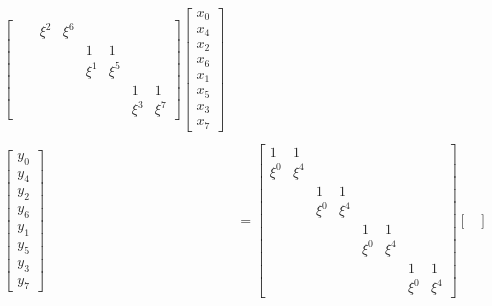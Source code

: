 \documentclass{jsarticle}
\begin{document}
\begin{align*}
\begin{bmatrix}
          &       & \xi^2 & \xi^6 &       &       &       &       \\
          &       &       &       & 1     & 1     &       &       \\
          &       &       &       & \xi^1 & \xi^5 &       &       \\
          &       &       &       &       &       & 1     & 1     \\
          &       &       &       &       &       & \xi^3 & \xi^7
  \end{bmatrix}
  \begin{bmatrix}
    x_0 \\
    x_4 \\
    x_2 \\
    x_6 \\
    x_1 \\
    x_5 \\
    x_3 \\
    x_7
  \end{bmatrix}
  \tag{3}
  \\
  \\
  \begin{bmatrix}
    y_0 \\
    y_4 \\
    y_2 \\
    y_6 \\
    y_1 \\
    y_5 \\
    y_3 \\
    y_7
  \end{bmatrix}
  &=
  \begin{bmatrix}
    1     & 1     &       &       &       &       &       &       \\
    \xi^0 & \xi^4 &       &       &       &       &       &       \\
          &       & 1     & 1     &       &       &       &       \\
          &       & \xi^0 & \xi^4 &       &       &       &       \\
          &       &       &       & 1     & 1     &       &       \\
          &       &       &       & \xi^0 & \xi^4 &       &       \\
          &       &       &       &       &       & 1     & 1     \\
          &       &       &       &       &       & \xi^0 & \xi^4
  \end{bmatrix}
  \begin{bmatrix}

\end{bmatrix}
\end{align*}
\end{document}
